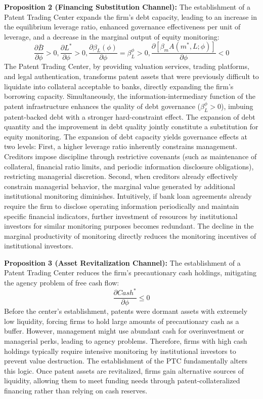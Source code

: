 \documentclass[12pt,a4paper]{article}
\begin{document}
\textbf{Proposition 2 (Financing Substitution Channel):} The establishment of a Patent Trading Center expands the firm's debt capacity, leading to an increase in the equilibrium leverage ratio, enhanced governance effectiveness per unit of leverage, and a decrease in the marginal output of equity monitoring:
\begin{equation}
\frac{\partial \bar{B}}{\partial \phi} > 0, \frac{\partial L^*}{\partial \phi} > 0, \frac{\partial \beta_L(\phi)}{\partial \phi} = \beta_L^\phi > 0, \frac{\partial [\beta_m A(m^*, L; \phi)]}{\partial \phi} < 0
\end{equation}
The Patent Trading Center, by providing valuation services, trading platforms, and legal authentication, transforms patent assets that were previously difficult to liquidate into collateral acceptable to banks, directly expanding the firm's borrowing capacity. Simultaneously, the information-intermediary function of the patent infrastructure enhances the quality of debt governance ($\beta_L^\phi > 0$), imbuing patent-backed debt with a stronger hard-constraint effect. The expansion of debt quantity and the improvement in debt quality jointly constitute a substitution for equity monitoring. The expansion of debt capacity yields governance effects at two levels: First, a higher leverage ratio inherently constrains management. Creditors impose discipline through restrictive covenants (such as maintenance of collateral, financial ratio limits, and periodic information disclosure obligations), restricting managerial discretion. Second, when creditors already effectively constrain managerial behavior, the marginal value generated by additional institutional monitoring diminishes. Intuitively, if bank loan agreements already require the firm to disclose operating information periodically and maintain specific financial indicators, further investment of resources by institutional investors for similar monitoring purposes becomes redundant. The decline in the marginal productivity of monitoring directly reduces the monitoring incentives of institutional investors.

\textbf{Proposition 3 (Asset Revitalization Channel):} The establishment of a Patent Trading Center reduces the firm's precautionary cash holdings, mitigating the agency problem of free cash flow:
\begin{equation}
\frac{\partial Cash^*}{\partial \phi} \le 0
\end{equation}
Before the center's establishment, patents were dormant assets with extremely low liquidity, forcing firms to hold large amounts of precautionary cash as a buffer. However, management might use abundant cash for overinvestment or managerial perks, leading to agency problems. Therefore, firms with high cash holdings typically require intensive monitoring by institutional investors to prevent value destruction. The establishment of the PTC fundamentally alters this logic. Once patent assets are revitalized, firms gain alternative sources of liquidity, allowing them to meet funding needs through patent-collateralized financing rather than relying on cash reserves.
\end{document}
